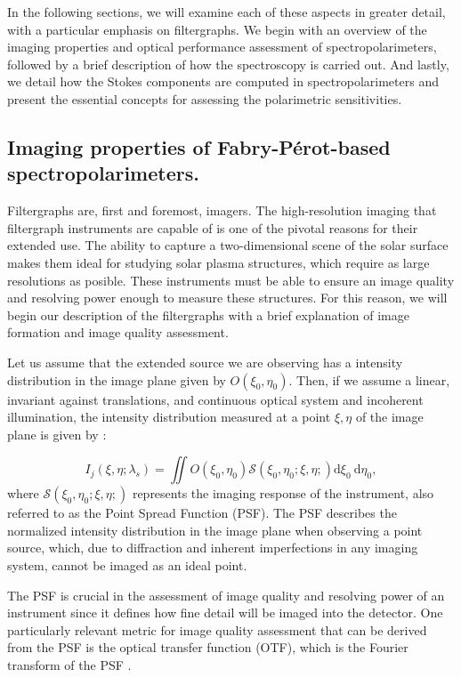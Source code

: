 In the following sections, we will examine each of these aspects in greater detail, with a particular emphasis on filtergraphs. We begin with an overview of the imaging properties and optical performance assessment of spectropolarimeters, followed by a brief description of how the spectroscopy is carried out. And lastly, we detail how the Stokes components are computed in spectropolarimeters and present the essential concepts for assessing the polarimetric sensitivities. 

\subsection{Imaging properties of Fabry-Pérot-based spectropolarimeters.\label{sec: intro-imaging}}

Filtergraphs are, first and foremost, imagers. The high-resolution imaging that filtergraph instruments are capable of is one of the pivotal reasons for their extended use. The ability to capture a two-dimensional scene of the solar surface makes them ideal for studying solar plasma structures, which require as large resolutions as posible. These instruments must be able to ensure an image quality and resolving power enough to measure these structures. For this reason, we will begin our description of the filtergraphs with a brief explanation of image formation and image quality assessment. 

Let us assume that the extended source we are observing has a intensity distribution in the image plane given by $O(\xi _ 0, \eta _ 0)$. Then, if we assume a linear, invariant against translations, and continuous optical system and incoherent illumination, the intensity distribution measured at a point $\xi, \eta$ of the image plane is given by : 

\begin{equation}
  I_ j\left(\xi, \eta ; \lambda_{s}\right)= \iint  O\left(\xi_0, \eta_0\right)  \mathcal{S}\left(\xi_0, \eta_0; \xi , \eta;\right)  \mathrm{d} \xi_{0} \mathrm{~d} \eta_{0},
  \label{eq_imaging: intensity_simple}
\end{equation}
where $\mathcal{S}\left(\xi_0, \eta_0; \xi , \eta;\right)$ represents the imaging response of the instrument, also referred to as the Point Spread Function (PSF). The PSF describes the normalized intensity distribution in the image plane when observing a point source, which, due to diffraction and inherent imperfections in any imaging system, cannot be imaged as an ideal point.

The PSF is crucial in the assessment of image quality and resolving power of an instrument since it defines how fine detail will be imaged into the detector. One particularly relevant metric for image quality assessment that can be derived from the PSF is the optical transfer function (OTF), which is the Fourier transform of the PSF \citep{vargas_tesis}. 

